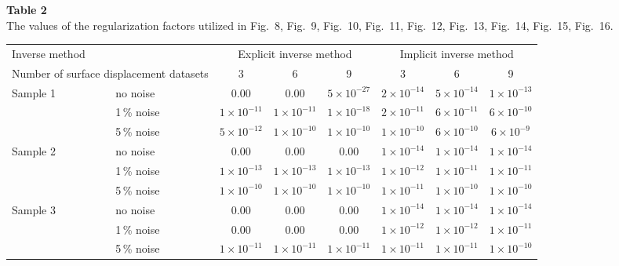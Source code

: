 \documentclass[11pt]{article}
\begin{document}
\noindent\textbf{Table 2}\\[0.2em]
{\small The values of the regularization factors utilized in
Fig.~8, Fig.~9, Fig.~10, Fig.~11, Fig.~12, Fig.~13, Fig.~14,
Fig.~15, Fig.~16.}
\vspace{0.3em}

\begin{center}
\footnotesize
\begin{tabular}{@{}ll ccc ccc@{}}
\toprule
\multicolumn{2}{l}{Inverse method}
  & \multicolumn{3}{c}{Explicit inverse method}
  & \multicolumn{3}{c}{Implicit inverse method} \\
\cmidrule(lr){3-5}\cmidrule(lr){6-8}
\multicolumn{2}{l}{Number of surface displacement datasets}
  & 3 & 6 & 9 & 3 & 6 & 9 \\
\midrule
\multirow{3}{*}{Sample 1}
  & no noise  & 0.00            & 0.00            & $5\times 10^{-27}$ & $2\times 10^{-14}$ & $5\times 10^{-14}$ & $1\times 10^{-13}$ \\
  & 1\,\% noise & $1\times 10^{-11}$ & $1\times 10^{-11}$ & $1\times 10^{-18}$ & $2\times 10^{-11}$ & $6\times 10^{-11}$ & $6\times 10^{-10}$ \\
  & 5\,\% noise & $5\times 10^{-12}$ & $1\times 10^{-10}$ & $1\times 10^{-10}$ & $1\times 10^{-10}$ & $6\times 10^{-10}$ & $6\times 10^{-9}$  \\
\midrule
\multirow{3}{*}{Sample 2}
  & no noise  & 0.00            & 0.00            & 0.00            & $1\times 10^{-14}$ & $1\times 10^{-14}$ & $1\times 10^{-14}$ \\
  & 1\,\% noise & $1\times 10^{-13}$ & $1\times 10^{-13}$ & $1\times 10^{-13}$ & $1\times 10^{-12}$ & $1\times 10^{-11}$ & $1\times 10^{-11}$ \\
  & 5\,\% noise & $1\times 10^{-10}$ & $1\times 10^{-10}$ & $1\times 10^{-10}$ & $1\times 10^{-11}$ & $1\times 10^{-10}$ & $1\times 10^{-10}$ \\
\midrule
\multirow{3}{*}{Sample 3}
  & no noise  & 0.00            & 0.00            & 0.00            & $1\times 10^{-14}$ & $1\times 10^{-14}$ & $1\times 10^{-14}$ \\
  & 1\,\% noise & 0.00            & 0.00            & 0.00            & $1\times 10^{-12}$ & $1\times 10^{-12}$ & $1\times 10^{-11}$ \\
  & 5\,\% noise & $1\times 10^{-11}$ & $1\times 10^{-11}$ & $1\times 10^{-11}$ & $1\times 10^{-11}$ & $1\times 10^{-11}$ & $1\times 10^{-10}$ \\
\bottomrule
\end{tabular}
\end{center}
\end{document}
